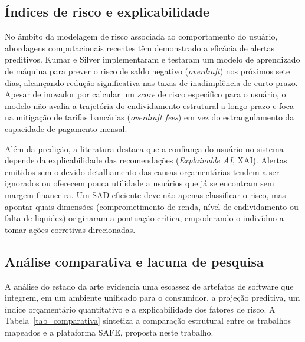 \documentclass[portuguese]{sbc2025}%
\begin{document}
\subsection{Índices de risco e explicabilidade}
No âmbito da modelagem de risco associada ao comportamento do usuário, abordagens computacionais recentes têm demonstrado a eficácia de alertas preditivos. Kumar e Silver \citeyearpar{kumar2024} implementaram e testaram um modelo de aprendizado de máquina para prever o risco de saldo negativo (\textit{overdraft}) nos próximos sete dias, alcançando redução significativa nas taxas de inadimplência de curto prazo. Apesar de inovador por calcular um \textit{score} de risco específico para o usuário, o modelo não avalia a trajetória do endividamento estrutural a longo prazo e foca na mitigação de tarifas bancárias (\textit{overdraft fees}) em vez do estrangulamento da capacidade de pagamento mensal.

Além da predição, a literatura destaca que a confiança do usuário no sistema depende da explicabilidade das recomendações (\textit{Explainable AI}, XAI). Alertas emitidos sem o devido detalhamento das causas orçamentárias tendem a ser ignorados ou oferecem pouca utilidade a usuários que já se encontram sem margem financeira. Um SAD eficiente deve não apenas classificar o risco, mas apontar quais dimensões (comprometimento de renda, nível de endividamento ou falta de liquidez) originaram a pontuação crítica, empoderando o indivíduo a tomar ações corretivas direcionadas.

\subsection{Análise comparativa e lacuna de pesquisa}
A análise do estado da arte evidencia uma escassez de artefatos de software que integrem, em um ambiente unificado para o consumidor, a projeção preditiva, um índice orçamentário quantitativo e a explicabilidade dos fatores de risco. A Tabela~\ref{tab_comparativa} sintetiza a comparação estrutural entre os trabalhos mapeados e a plataforma SAFE, proposta neste trabalho.
\end{document}
